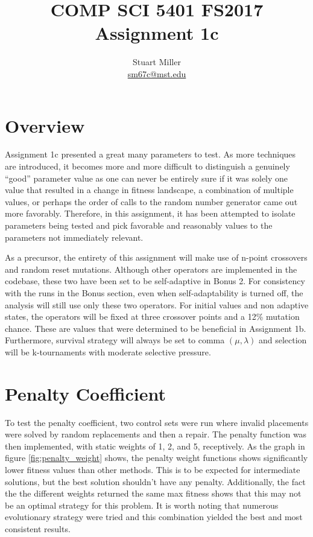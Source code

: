 \documentclass[11pt]{article}
\begin{document}
\title{COMP SCI 5401 FS2017 Assignment 1c}
\author{Stuart Miller\\\href{mailto:sm67c@mst.edu}{sm67c@mst.edu}}
\maketitle


\section{Overview}

Assignment 1c presented a great many parameters to test. As more techniques are introduced, it becomes more and more difficult to distinguish a genuinely "`good"' parameter value as one can never be entirely sure if it was solely one value that resulted in a change in fitness landscape, a combination of multiple values, or perhaps the order of calls to the random number generator came out more favorably. Therefore, in this assignment, it has been attempted to isolate parameters being tested and pick favorable and reasonably values to the parameters not immediately relevant.

As a precursor, the entirety of this assignment will make use of n-point crossovers and random reset mutations. Although other operators are implemented in the codebase, these two have been set to be self-adaptive in Bonus 2. For consistency with the runs in the Bonus section, even when self-adaptability is turned off, the analysis will still use only these two operators. For initial values and non adaptive states, the operators will be fixed at three crossover points and a 12\% mutation chance. These are values that were determined to be beneficial in Assignment 1b. Furthermore, survival strategy will always be set to comma \((\mu,\lambda)\) and selection will be k-tournaments with moderate selective pressure.


\section{Penalty Coefficient}

To test the penalty coefficient, two control sets were run where invalid placements were solved by random replacements and then a repair. The penalty function was then implemented, with static weights of 1, 2, and 5, receptively. As the graph in figure \ref{fig:penalty_weight} shows, the penalty weight functions shows significantly lower fitness values than other methods. This is to be expected for intermediate solutions, but the best solution shouldn't have any penalty. Additionally, the fact the the different weights returned the same max fitness shows that this may not be an optimal strategy for this problem. It is worth noting that numerous evolutionary strategy were tried and this combination yielded the best and most consistent results.
\end{document}
